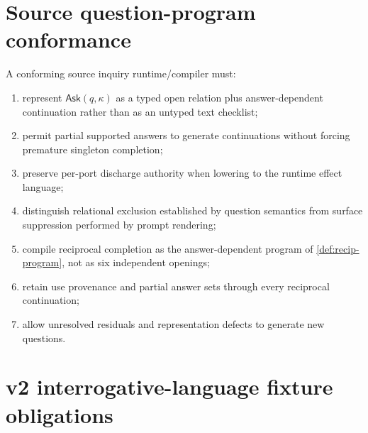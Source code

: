 \documentclass[11pt,oneside]{article}
\begin{document}
\section{Source question-program conformance}

A conforming source inquiry runtime/compiler must:
\begin{enumerate}
\item represent \(\mathsf{Ask}(q,\kappa)\) as a typed open relation plus answer-dependent continuation rather than as an untyped text checklist;
\item permit partial supported answers to generate continuations without forcing premature singleton completion;
\item preserve per-port discharge authority when lowering to the runtime effect language;
\item distinguish relational exclusion established by question semantics from surface suppression performed by prompt rendering;
\item compile reciprocal completion as the answer-dependent program of \cref{def:recip-program}, not as six independent openings;
\item retain use provenance and partial answer sets through every reciprocal continuation;
\item allow unresolved residuals and representation defects to generate new questions.
\end{enumerate}

\section{v2 interrogative-language fixture obligations}\label{sec:v2-question-fixtures}
\end{document}
